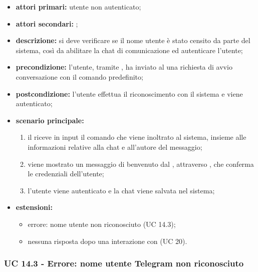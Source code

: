 	\begin{itemize}
		\item \textbf{attori primari:} utente non autenticato;
		\item \textbf{attori secondari:} ;
		\item \textbf{descrizione:} si deve verificare se il nome utente è stato censito da parte del sistema, così da abilitare la chat di comunicazione ed autenticare l'utente;
		\item \textbf{precondizione:} l'utente, tramite , ha inviato al  una richiesta di avvio conversazione con il comando predefinito;
		\item \textbf{postcondizione:} l'utente effettua il riconoscimento con il sistema e viene autenticato;
		\item \textbf{scenario principale:}
		\begin{enumerate}
			\item il   riceve in input il comando che viene inoltrato al sistema, insieme alle informazioni relative alla chat e all'autore del messaggio;
			\item viene mostrato un messaggio di benvenuto dal , attraverso , che conferma le credenziali dell'utente;
			\item l'utente viene autenticato e la chat viene salvata nel sistema;
		\end{enumerate}
		\item \textbf{estensioni:}
		\begin{itemize}
			\item errore: nome utente  non riconosciuto (UC 14.3);
			\item nessuna risposta dopo una interazione con  (UC 20).
		\end{itemize}
	\end{itemize}

	\subsubsection{UC 14.3 - Errore: nome utente Telegram non riconosciuto}

